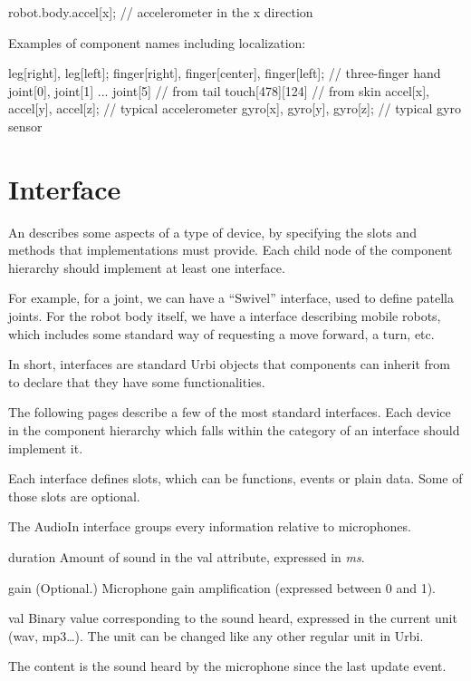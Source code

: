 \begin{urbiunchecked}
robot.body.accel[x]; // accelerometer in the x direction
\end{urbiunchecked}


Examples of component names including localization:

\begin{urbiunchecked}
leg[right], leg[left];
finger[right], finger[center], finger[left];  // three-finger hand
joint[0], joint[1] ... joint[5]               // from tail
touch[478][124]                               // from skin
accel[x], accel[y], accel[z];                 // typical accelerometer
gyro[x], gyro[y], gyro[z];                    // typical gyro sensor
\end{urbiunchecked}

\section{Interface}
\label{sec:interface}

An  describes some aspects of a type of device, by specifying
the slots and methods that implementations must provide. Each child node of
the component hierarchy should implement at least one interface.

For example, for a joint, we can have a ``Swivel'' interface, used to define
patella joints. For the robot body itself, we have a 
interface describing mobile robots, which includes some standard way of
requesting a move forward, a turn, etc.

In short, interfaces are standard Urbi objects that components can inherit
from to declare that they have some functionalities.

The following pages describe a few of the most standard interfaces. Each
device in the component hierarchy which falls within the category of an
interface should implement it.

Each interface defines slots, which can be functions, events or plain data.
Some of those slots are optional.



The AudioIn interface groups every information relative to microphones.

\begin{urbiscriptapi}
\item[duration] Amount of sound in the val attribute, expressed in
  \textit{ms}.


\item[gain]{} (Optional.) Microphone gain amplification (expressed between 0
  and 1).


\item[val] Binary value corresponding to the sound heard, expressed in the
  current unit (wav, mp3\ldots). The unit can be changed like any other regular
  unit in Urbi.

  The content is the sound heard by the microphone since the last update
  event.
\end{urbiscriptapi}


